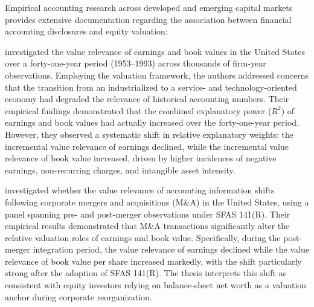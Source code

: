 Empirical accounting research across developed and emerging capital markets provides extensive documentation regarding the association between financial accounting disclosures and equity valuation:

\citet{collins1997} investigated the value relevance of earnings and book values in the United States over a forty-one-year period (1953--1993) across thousands of firm-year observations. Employing the \citet{ohlson1995} valuation framework, the authors addressed concerns that the transition from an industrialized to a service- and technology-oriented economy had degraded the relevance of historical accounting numbers. Their empirical findings demonstrated that the combined explanatory power ($R^2$) of earnings and book values had actually increased over the forty-one-year period. However, they observed a systematic shift in relative explanatory weights: the incremental value relevance of earnings declined, while the incremental value relevance of book value increased, driven by higher incidences of negative earnings, non-recurring charges, and intangible asset intensity.

\citet{kwon2020} investigated whether the value relevance of accounting information shifts following corporate mergers and acquisitions (M\&A) in the United States, using a panel spanning pre- and post-merger observations under SFAS 141(R). Their empirical results demonstrated that M\&A transactions significantly alter the relative valuation roles of earnings and book value. Specifically, during the post-merger integration period, the value relevance of earnings declined while the value relevance of book value per share increased markedly, with the shift particularly strong after the adoption of SFAS 141(R). The thesis interprets this shift as consistent with equity investors relying on balance-sheet net worth as a valuation anchor during corporate reorganization.

